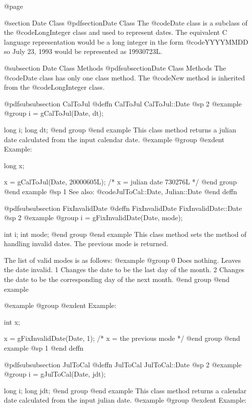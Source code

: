 @page

@section Date Class
@pdfsection{Date Class}
The @code{Date} class is a subclass of the @code{LongInteger}
class and used to represent dates.  The equivalent C language
representation would be a long integer in the form @code{YYYYMMDD}
so July 23, 1993 would be represented as 19930723L.





@subsection Date Class Methods
@pdfsubsection{Date Class Methods}
The @code{Date} class has only one class method.  The @code{New}
method is inherited from the @code{LongInteger} class.






@pdfsubsubsection {CalToJul}
@deffn {CalToJul} CalToJul::Date
@sp 2
@example
@group
i = gCalToJul(Date, dt);

long  i;
long  dt;
@end group
@end example
This class method returns a julian date calculated from the
input calendar date.
@example
@group
@exdent Example:

long  x;

x = gCalToJul(Date, 20000605L);  /* x = julian date 730276L */
@end group
@end example
@sp 1
See also:  @code{JulToCal::Date, Julian::Date}
@end deffn






@pdfsubsubsection {FixInvalidDate}
@deffn {FixInvalidDate} FixInvalidDate::Date
@sp 2
@example
@group
i = gFixInvalidDate(Date, mode);

int  i;
int  mode;
@end group
@end example
This class method sets the method of handling invalid dates.  The
previous mode is returned.

The list of valid modes is as follows:
@example
@group
0   Does nothing.  Leaves the date invalid.
1   Changes the date to be the last day of the month.
2   Changes the date to be the corresponding day of the
    next month.
@end group
@end example

@example
@group
@exdent Example:

int  x;

x = gFixInvalidDate(Date, 1);   /*  x = the previous mode */
@end group
@end example
@sp 1
@end deffn






@pdfsubsubsection {JulToCal}
@deffn {JulToCal} JulToCal::Date
@sp 2
@example
@group
i = gJulToCal(Date, jdt);

long  i;
long  jdt;
@end group
@end example
This class method returns a calendar date calculated from the
input julian date.
@example
@group
@exdent Example:

